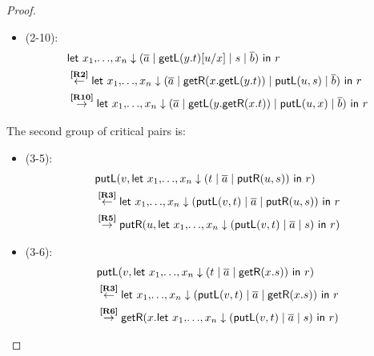 \documentclass[twoside,11pt,final]{entics}
\newcommand{\getl}{\mathsf{getL}}
\newcommand{\putr}{\mathsf{putR}}
\newcommand{\getr}{\mathsf{getR}}
\newcommand{\putl}{\mathsf{putL}}
\newcommand{\from}{\leftarrow}
\newcommand{\asn}{\downarrow}
\newcommand{\seq}{,\!\ldots\!,}
\begin{document}
\begin{proof}
\begin{itemize}
\begin{align*}
      \\& \overset{\text{\bf[R2]}}{\from} \textsf{let } x_1 \seq x_n \asn (\overline{a} \mid \getr(x.\putl(v,t)) \mid \putl(u,s) \mid \overline{b}) \textsf{ in } r 
      \\& \overset{\text{\bf[R9]}}{\to} \textsf{let } x_1 \seq x_n \asn (\overline{a} \mid \putl(v,\getr(x.t)) \mid \putl(u,x) \mid \overline{b}) \textsf{ in } r 
    \end{align*}
  \item[] (2-10): \vspace{-2em}
    \begin{align*}
      & \textsf{let } x_1 \seq x_n \asn (\overline{a} \mid \getl(y.t)[u/x] \mid s \mid \overline{b}) \textsf{ in } r 
      \\& \overset{\text{\bf[R2]}}{\from} \textsf{let } x_1 \seq x_n \asn (\overline{a} \mid \getr(x.\getl(y.t)) \mid \putl(u,s) \mid \overline{b}) \textsf{ in } r
      \\& \overset{\text{\bf[R10]}}{\to}\textsf{let } x_1 \seq x_n \asn (\overline{a} \mid \getl(y.\getr(x.t)) \mid \putl(u,x) \mid \overline{b}) \textsf{ in } r 
    \end{align*}
  \end{itemize}
  The second group of critical pairs is:
  \begin{itemize}
  \item[] (3-5): \vspace{-2em}
    \begin{align*}
     & \putl(v,\textsf{let } x_1 \seq x_n \asn (t \mid \overline{a} \mid \putr(u,s)) \textsf{ in } r)
      \\& \overset{\text{\bf[R3]}}{\from} \textsf{let } x_1 \seq x_n \asn (\putl(v,t) \mid \overline{a} \mid \putr(u,s)) \textsf{ in } r 
     \\& \overset{\text{\bf[R5]}}{\to} \putr(u,\textsf{let } x_1 \seq x_n \asn (\putl(v,t) \mid \overline{a} \mid s) \textsf{ in } r) 
    \end{align*}
  \item[] (3-6): \vspace{-2em}
    \begin{align*}
      & \putl(v,\textsf{let } x_1 \seq  x_n \asn (t \mid \overline{a} \mid \getr(x.s)) \textsf{ in } r) 
      \\& \overset{\text{\bf[R3]}}{\from} \textsf{let } x_1 \seq x_n \asn (\putl(v,t) \mid \overline{a} \mid \getr(x.s)) \textsf{ in } r 
      \\& \overset{\text{\bf[R6]}}{\to} \getr(x.\textsf{let } x_1 \seq x_n \asn (\putl(v,t) \mid \overline{a} \mid s) \textsf{ in } r) 

\end{align*}
\end{itemize}
\end{proof}
\end{document}
